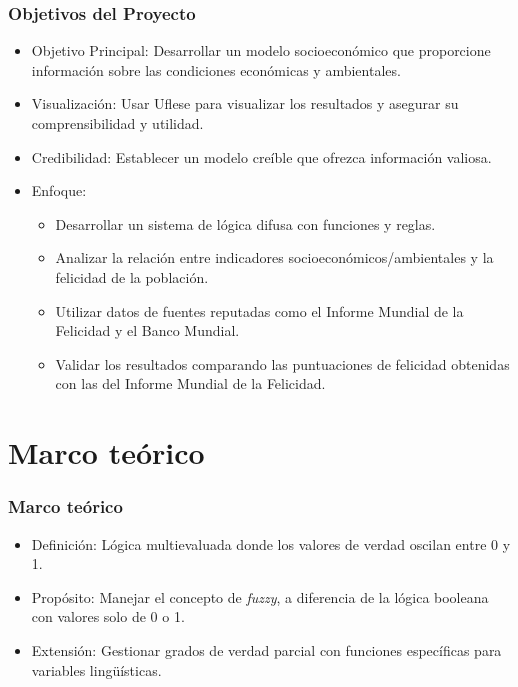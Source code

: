 \documentclass{beamer}
\begin{document}
\begin{frame}
\frametitle{Objetivos del Proyecto}
\begin{itemize}
    \item Objetivo Principal: Desarrollar un modelo socioeconómico que proporcione información sobre las condiciones económicas y ambientales.
    \item Visualización: Usar Uflese para visualizar los resultados y asegurar su comprensibilidad y utilidad.
    \item Credibilidad: Establecer un modelo creíble que ofrezca información valiosa.
    \item Enfoque:
    \begin{itemize}
        \item Desarrollar un sistema de lógica difusa con funciones y reglas.
        \item Analizar la relación entre indicadores socioeconómicos/ambientales y la felicidad de la población.
        \item Utilizar datos de fuentes reputadas como el Informe Mundial de la Felicidad y el Banco Mundial.
        \item Validar los resultados comparando las puntuaciones de felicidad obtenidas con las del Informe Mundial de la Felicidad.
    \end{itemize}
\end{itemize}

\end{frame}

\section{Marco teórico}
\begin{frame}
\frametitle{Marco teórico}
\begin{itemize}
    \item Definición: Lógica multievaluada donde los valores de verdad oscilan entre 0 y 1.
    \item Propósito: Manejar el concepto de \textit{fuzzy}, a diferencia de la lógica booleana con valores solo de 0 o 1.
    \item Extensión: Gestionar grados de verdad parcial con funciones específicas para variables lingüísticas.
\end{itemize}

\end{frame}
\end{document}

